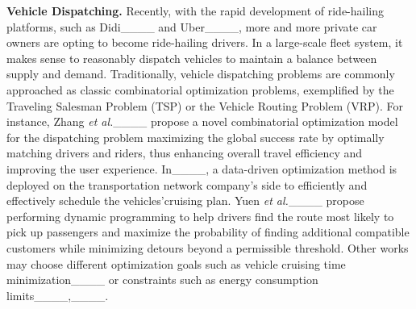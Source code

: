 
\smallskip
\noindent\textbf{Vehicle Dispatching.}
Recently, with the rapid development of ride-hailing platforms, such as Didi____
and Uber____, more and more private car owners are opting to become ride-hailing drivers. In a large-scale fleet system, it makes sense to reasonably dispatch vehicles to maintain a balance between supply and demand. Traditionally, vehicle dispatching problems are commonly approached as classic combinatorial optimization problems, exemplified by the Traveling Salesman Problem (TSP) or the Vehicle Routing Problem (VRP). 
For instance, Zhang \emph{et al.}____ propose a novel combinatorial optimization model for the dispatching problem maximizing the global success rate by optimally matching drivers and riders, thus enhancing overall travel efficiency and improving the user experience.
In____, a data-driven optimization method is deployed on the transportation network company's side to efficiently and effectively schedule the vehicles’cruising plan.
Yuen \emph{et al.}____ propose performing dynamic programming to help drivers find the route most likely to pick up passengers and maximize the probability of finding additional compatible customers while minimizing detours beyond a permissible threshold.
Other works may choose different optimization goals such as vehicle cruising time minimization____ or constraints such as energy consumption limits____,____. 
